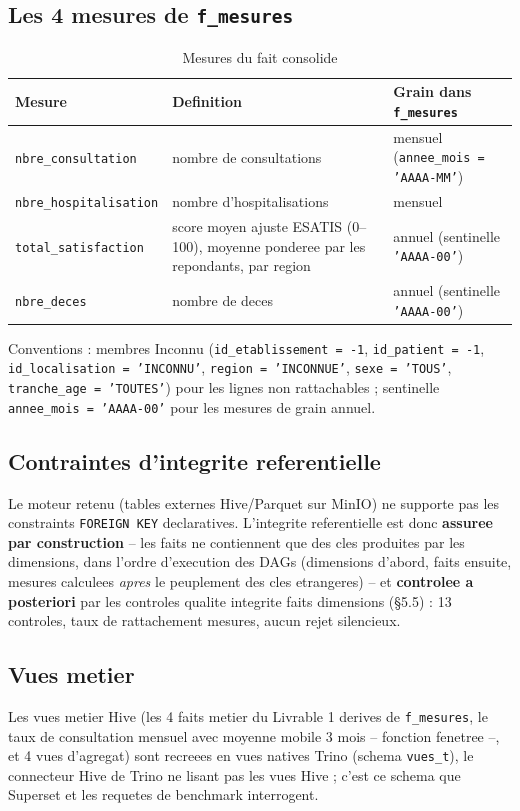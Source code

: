 \documentclass[11pt,a4paper]{article}
\begin{document}
\subsection{Les 4 mesures de \texttt{f\_mesures}}
\begin{table}[H]\centering\small
\caption{Mesures du fait consolide}
\begin{tabular}{p{3.8cm}p{6.2cm}p{5.2cm}}
\toprule
\textbf{Mesure} & \textbf{Definition} & \textbf{Grain dans \texttt{f\_mesures}} \\
\midrule
\texttt{nbre\_consultation} & nombre de consultations & mensuel (\texttt{annee\_mois = 'AAAA-MM'}) \\
\texttt{nbre\_hospitalisation} & nombre d'hospitalisations & mensuel \\
\texttt{total\_satisfaction} & score moyen ajuste ESATIS (0--100), moyenne ponderee par les repondants, par region & annuel (sentinelle \texttt{'AAAA-00'}) \\
\texttt{nbre\_deces} & nombre de deces & annuel (sentinelle \texttt{'AAAA-00'}) \\
\bottomrule
\end{tabular}
\end{table}

Conventions : membres \guillemotleft{}Inconnu\guillemotright{} (\texttt{id\_etablissement = -1},
\texttt{id\_patient = -1}, \texttt{id\_localisation = 'INCONNU'},
\texttt{region = 'INCONNUE'}, \texttt{sexe = 'TOUS'}, \texttt{tranche\_age = 'TOUTES'})
pour les lignes non rattachables ; sentinelle \texttt{annee\_mois = 'AAAA-00'} pour
les mesures de grain annuel.

\subsection{Contraintes d'integrite referentielle}
Le moteur retenu (tables externes Hive/Parquet sur MinIO) ne supporte pas les
constraints \texttt{FOREIGN KEY} declaratives. L'integrite referentielle est
donc \textbf{assuree par construction} -- les faits ne contiennent que des cles
produites par les dimensions, dans l'ordre d'execution des DAGs (dimensions
d'abord, faits ensuite, mesures calculees \emph{apres} le peuplement des cles
etrangeres) -- et \textbf{controlee a posteriori} par les controles qualite
\guillemotleft{}integrite faits \textrightarrow dimensions\guillemotright{} (\S5.5) :
13 controles, taux de rattachement mesures, aucun rejet silencieux.

\subsection{Vues metier}
Les vues metier Hive (les 4 faits metier du Livrable 1 derives de
\texttt{f\_mesures}, le taux de consultation mensuel avec moyenne mobile 3 mois
-- fonction fenetree --, et 4 vues d'agregat) sont recreees en vues natives Trino
(schema \texttt{vues\_t}), le connecteur Hive de Trino ne lisant pas les vues
Hive ; c'est ce schema que Superset et les requetes de benchmark interrogent.
\end{document}
